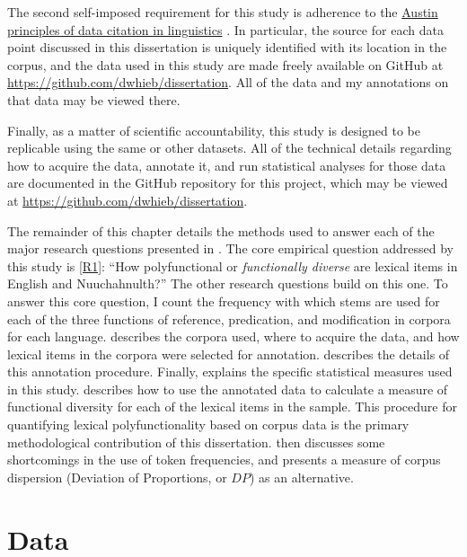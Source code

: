 The second self-imposed requirement for this study is adherence to the \href{https://site.uit.no/linguisticsdatacitation/}{Austin principles of data citation in linguistics} \parencite{BerezKroekeretal2018}. In particular, the source for each data point discussed in this dissertation is uniquely identified with its location in the corpus, and the data used in this study are made freely available on GitHub at \url{https://github.com/dwhieb/dissertation}. All of the data and my annotations on that data may be viewed there.

Finally, as a matter of scientific accountability, this study is designed to be replicable using the same or other datasets. All of the technical details regarding how to acquire the data, annotate it, and run statistical analyses for those data are documented in the GitHub repository for this project, which may be viewed at \url{https://github.com/dwhieb/dissertation}.

The remainder of this chapter details the methods used to answer each of the major research questions presented in . The core empirical question addressed by this study is \ref{R1}: \enquote{How polyfunctional or \emph{functionally diverse} are lexical items in English and Nuuchahnulth?} The other research questions build on this one. To answer this core question, I count the frequency with which stems are used for each of the three functions of reference, predication, and modification in corpora for each language.  describes the corpora used, where to acquire the data, and how lexical items in the corpora were selected for annotation.  describes the details of this annotation procedure. Finally,  explains the specific statistical measures used in this study.  describes how to use the annotated data to calculate a measure of functional diversity for each of the lexical items in the sample. This procedure for quantifying lexical polyfunctionality based on corpus data is the primary methodological contribution of this dissertation.  then discusses some shortcomings in the use of token frequencies, and presents a measure of corpus dispersion (Deviation of Proportions, or $DP$) as an alternative.

\section{Data}
\label{sec:3.2}

